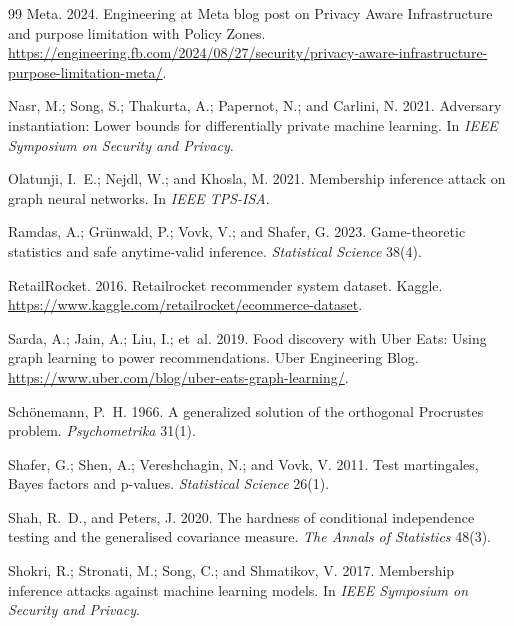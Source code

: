 \documentclass[10pt,twocolumn,letterpaper]{article}
\theoremstyle{definition}
\begin{document}
\begin{thebibliography}{99}
Meta. 2024.
\newblock Engineering at Meta blog post on Privacy Aware Infrastructure and purpose limitation with Policy Zones.
\newblock \url{https://engineering.fb.com/2024/08/27/security/privacy-aware-infrastructure-purpose-limitation-meta/}.

Nasr, M.; Song, S.; Thakurta, A.; Papernot, N.; and Carlini, N. 2021.
\newblock Adversary instantiation: Lower bounds for differentially private machine learning.
\newblock In \emph{IEEE Symposium on Security and Privacy}.

Olatunji, I.~E.; Nejdl, W.; and Khosla, M. 2021.
\newblock Membership inference attack on graph neural networks.
\newblock In \emph{IEEE TPS-ISA}.

Ramdas, A.; Gr{\"u}nwald, P.; Vovk, V.; and Shafer, G. 2023.
\newblock Game-theoretic statistics and safe anytime-valid inference.
\newblock \emph{Statistical Science} 38(4).

RetailRocket. 2016.
\newblock Retailrocket recommender system dataset.
\newblock Kaggle. \url{https://www.kaggle.com/retailrocket/ecommerce-dataset}.

Sarda, A.; Jain, A.; Liu, I.; et~al. 2019.
\newblock Food discovery with Uber Eats: Using graph learning to power recommendations.
\newblock Uber Engineering Blog. \url{https://www.uber.com/blog/uber-eats-graph-learning/}.

Sch{\"o}nemann, P.~H. 1966.
\newblock A generalized solution of the orthogonal Procrustes problem.
\newblock \emph{Psychometrika} 31(1).

Shafer, G.; Shen, A.; Vereshchagin, N.; and Vovk, V. 2011.
\newblock Test martingales, Bayes factors and p-values.
\newblock \emph{Statistical Science} 26(1).

Shah, R.~D., and Peters, J. 2020.
\newblock The hardness of conditional independence testing and the generalised covariance measure.
\newblock \emph{The Annals of Statistics} 48(3).

Shokri, R.; Stronati, M.; Song, C.; and Shmatikov, V. 2017.
\newblock Membership inference attacks against machine learning models.
\newblock In \emph{IEEE Symposium on Security and Privacy}.


\end{thebibliography}
\end{document}
